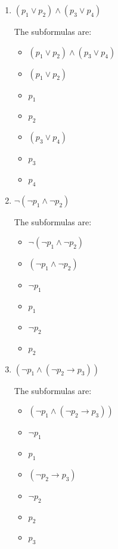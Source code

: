 \documentclass[11pt]{article}
\begin{document}
    \begin{enumerate}
        \item \textbf{$(p_1 \vee p_2) \wedge (p_3 \vee p_4)$}

        The subformulas are:
        \begin{itemize}
            \item $(p_1 \vee p_2) \wedge (p_3 \vee p_4)$
            \item $(p_1 \vee p_2)$
            \item $p_1$
            \item $p_2$
            \item $(p_3 \vee p_4)$
            \item $p_3$
            \item $p_4$
        \end{itemize}

        \item \textbf{$\neg (\neg p_1 \wedge \neg p_2)$}

        The subformulas are:
        \begin{itemize}
            \item $\neg(\neg p_1 \wedge \neg p_2)$
            \item $(\neg p_1 \wedge \neg p_2)$
            \item $\neg p_1$
            \item $p_1$
            \item $\neg p_2$
            \item $p_2$
        \end{itemize}

        \item \textbf{$(\neg p_1 \wedge (\neg p_2 \rightarrow p_3))$}

        The subformulas are:
        \begin{itemize}
            \item $(\neg p_1 \wedge (\neg p_2 \rightarrow p_3))$
            \item $\neg p_1$
            \item $p_1$
            \item $(\neg p_2 \rightarrow p_3)$
            \item $\neg p_2$
            \item $p_2$
            \item $p_3$
        \end{itemize}
    \end{enumerate}
\end{document}

